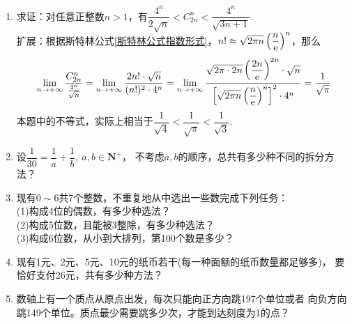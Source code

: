 \begin{enumerate}[label={\textbf{\thechapter.\arabic*}},leftmargin=
    \inteval{\myenumleftmargin}pt]
\item 求证：对任意正整数$ n>1 $，有$ \dfrac{4^n}{2\sqrt{n}}<
C_{2n}^{n} < \dfrac{4^n}{\sqrt{3n+1}} $. \\
扩展：根据斯特林公式\eqref{斯特林公式指数形式}，$n!\approx \sqrt{2\pi n}
\left(\dfrac{n}{\mathrm{e}}\right)^n$，那么
\begin{gather*}
    \lim_{n\to+\infty}\dfrac{C_{2n}^n}{\frac{4^n}{\sqrt{n}}}  = \lim_{n\to+\infty}
    \dfrac{2n!\cdot \sqrt{n}}{(n!)^2\cdot 4^n} 
    = \lim_{n\to+\infty} \dfrac{\sqrt{2\pi \cdot 2n}\left(\dfrac{2n}{\mathrm{e}}
        \right)^{2n}\cdot \sqrt{n}}{\left[\sqrt{2\pi n}
        \left(\dfrac{n}{\mathrm{e}}\right)^n\right]^2 \cdot 4^n} = \dfrac{1}{\sqrt{\pi}}    
\end{gather*}
本题中的不等式，实际上相当于$\dfrac{1}{\sqrt{4}}<\dfrac{1}{\sqrt{\pi}}
<\dfrac{1}{\sqrt{3}}$.

\item 设$ \dfrac{1}{30}=\dfrac{1}{a}+\dfrac{1}{b},\ a,b\in\textbf{N}^+ $，
不考虑$ a,b $的顺序，总共有多少种不同的拆分方法？

\item 现有$ 0\sim 6 $共7个整数，不重复地从中选出一些数完成下列任务：\\
(1)构成4位的偶数，有多少种选法？\\
(2)构成5位数，且能被3整除，有多少种选法？\\
(3)构成6位数，从小到大排列，第100个数是多少？

\item 现有1元、2元、5元、10元的纸币若干(每一种面额的纸币数量都足够多)，
要恰好支付26元，共有多少种方法？ 

\item 数轴上有一个质点从原点出发，每次只能向正方向跳197个单位或者
向负方向跳149个单位。质点最少需要跳多少次，才能到达刻度为1的点？

\end{enumerate}


